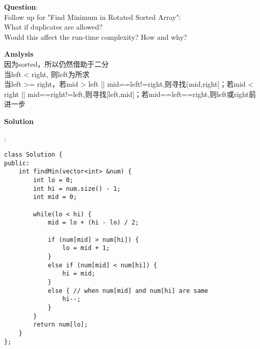     
\begin{description}
    \item{\textbf{Question}}:\\%
		Follow up for "Find Minimum in Rotated Sorted Array":\\
		What if duplicates are allowed?\\
		Would this affect the run-time complexity? How and why?\\

    \item{\textbf{Anslysis}}\\
		因为sorted，所以仍然借助于二分\\
		当left < right, 则left为所求\\
		当left >= right，若mid > left || mid==left!=right,则寻找(mid,right]；若mid < right || mid==right!=left,则寻找[left,mid]；若mid==left==right,则left或right前进一步\\

    \item{\textbf{Solution}}\\
	\item{} : \\
		\begin{lstlisting}
class Solution {
public:
    int findMin(vector<int> &num) {
        int lo = 0;
        int hi = num.size() - 1;
        int mid = 0;

        while(lo < hi) {
            mid = lo + (hi - lo) / 2;

            if (num[mid] > num[hi]) {
                lo = mid + 1;
            }
            else if (num[mid] < num[hi]) {
                hi = mid;
            }
            else { // when num[mid] and num[hi] are same
                hi--;
            }
        }
        return num[lo];
    }
};		\end{lstlisting}

\end{description}

